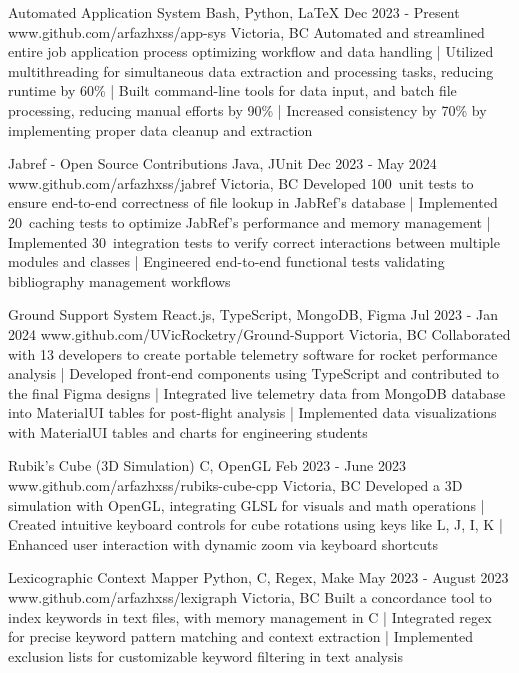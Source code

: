 \documentclass[a4paper,10pt]{article}
\begin{document}
\projectentry
{Automated Application System}
{Bash, Python, LaTeX}
{Dec 2023 - Present}
{www.github.com/arfazhxss/app-sys}
{Victoria, BC}
{Automated and streamlined entire job application process optimizing workflow and data handling
| Utilized multithreading for simultaneous data extraction and processing tasks, reducing runtime by 60\% 
| Built command-line tools for data input, and batch file processing, reducing manual efforts by 90\% 
| Increased consistency by 70\% by implementing proper data cleanup and extraction
}

\projectentry
{Jabref - Open Source Contributions}
{Java, JUnit}
{Dec 2023 - May 2024}
{www.github.com/arfazhxss/jabref}
{Victoria, BC}
{Developed 100\plus\ unit tests to ensure end-to-end correctness of file lookup in JabRef's database
| Implemented 20\plus\ caching tests to optimize JabRef's performance and memory management
| Implemented 30\plus\ integration tests to verify correct interactions between multiple modules and classes
| Engineered end-to-end functional tests validating bibliography management workflows
}

\projectentry
{Ground Support System}
{React.js, TypeScript, MongoDB, Figma}
{Jul 2023 - Jan 2024}
{www.github.com/UVicRocketry/Ground-Support}
{Victoria, BC}
{Collaborated with 13 developers to create portable telemetry software for rocket performance analysis 
| Developed front-end components using TypeScript and contributed to the final Figma designs
| Integrated live telemetry data from MongoDB database into MaterialUI tables for post-flight analysis
| Implemented data visualizations with MaterialUI tables and charts for engineering students 
}

\projectentry
{Rubik's Cube (3D Simulation)}
{C\plus\plus, OpenGL}
{Feb 2023 - June 2023}
{www.github.com/arfazhxss/rubiks-cube-cpp}
{Victoria, BC}
{Developed a 3D simulation with OpenGL, integrating GLSL for visuals and math operations 
| Created intuitive keyboard controls for cube rotations using keys like L, J, I, K 
| Enhanced user interaction with dynamic zoom via keyboard shortcuts
}

\projectentry
{Lexicographic Context Mapper}
{Python, C, Regex, Make}
{May 2023 - August 2023}
{www.github.com/arfazhxss/lexigraph}
{Victoria, BC}
{Built a concordance tool to index keywords in text files, with memory management in C
| Integrated regex for precise keyword pattern matching and context extraction 
| Implemented exclusion lists for customizable keyword filtering in text analysis
}
\end{document}
